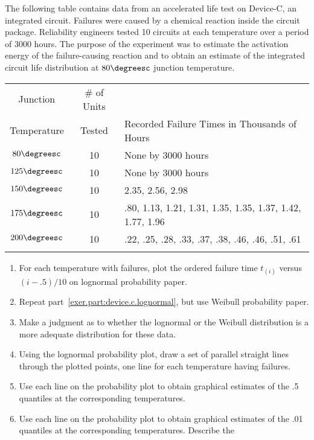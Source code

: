 \begin{exercise}
\label{exercise:devicec.analysis}
The following table contains data from an accelerated life test on 
Device-C, an integrated circuit. Failures were caused by a chemical
reaction inside the circuit package. Reliability engineers tested 10
circuits at each temperature over a period of 3000 hours. The purpose of
the experiment was to estimate the activation energy of the
failure-causing reaction and to obtain an estimate of the integrated
circuit life distribution at $80\degreesc$ junction temperature.
\\[3ex]
\begin{tabular}{ccl}
Junction & \# of Units \\
Temperature &  Tested & Recorded Failure Times in Thousands of Hours \\
\hline
$80\degreesc$ &10& None by 3000 hours\\
$125\degreesc$&10& None by 3000 hours\\
$150\degreesc$&10  & 2.35, 2.56, 2.98\\
$175\degreesc$&10 & .80, 1.13, 1.21, 1.31, 
	1.35, 1.35, 1.37, 1.42, 1.77, 1.96\\
$200\degreesc$&10 & .22, .25, .28, .33, 
	.37, .38, .46, .46, .51, .61 \\
\hline
\\[2ex]
\end{tabular}
\begin{enumerate}
\item
\label{exer.part:device.c.lognormal}
For each temperature with failures, plot the ordered failure time
$t_{(i)}$ versus $(i-.5)/10$ on lognormal probability paper.
\item
Repeat part~\ref{exer.part:device.c.lognormal}, but use Weibull
probability paper.
\item
Make a judgment as to whether the lognormal or the Weibull
distribution is a more adequate distribution for these data.
\item
Using the lognormal probability plot, draw a set of parallel straight
lines through the plotted points, one line for each
temperature having failures.
\item
Use each line on the probability plot to obtain graphical estimates
of the .5 quantiles at the corresponding temperatures. 
\item
Use each line on the probability plot to obtain graphical estimates of
the .01 quantiles at the corresponding temperatures. Describe the

\end{enumerate}
\end{exercise}
